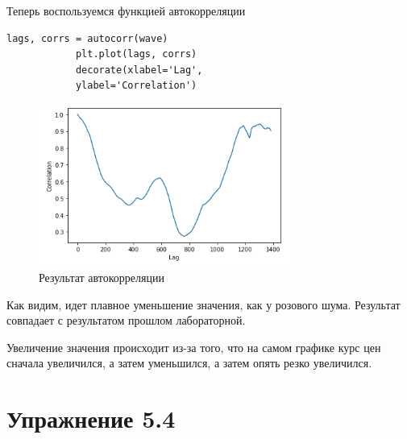 \documentclass[a4paper,12pt]{article}
\begin{document}
\begin{enumerate}
	
		Теперь воспользуемся функцией автокорреляции
		\begin{lstlisting}[caption=Автокоррелируем]
			lags, corrs = autocorr(wave)
			plt.plot(lags, corrs)
			decorate(xlabel='Lag',
			ylabel='Correlation')
		\end{lstlisting}
		\begin{figure}[H]
			\centering
			\includegraphics[width=0.75\textwidth]{3_3.png}
			\caption{Результат автокорреляции}
			\label{fig:3.3}
		\end{figure}
		
		Как видим, идет плавное уменьшение значения, как у розового шума. Результат совпадает с результатом прошлом лабораторной.
		
		Увеличение значения происходит из-за того, что на самом графике курс цен сначала увеличился, а затем уменьшился, а затем опять резко увеличился.
		
		
	\end{enumerate}
	\newpage
	
	
	\section{Упражнение 5.4}
	
\end{document}
